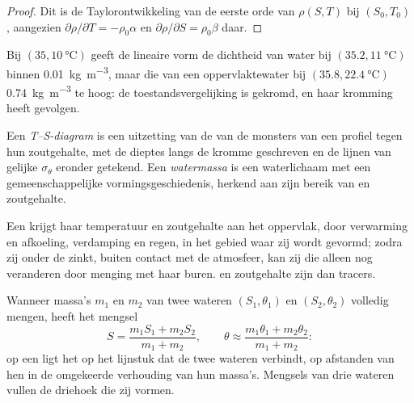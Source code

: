 \begin{proof}
Dit is de Taylorontwikkeling van de eerste orde van $\rho(S, T)$ bij $(S_0, T_0)$, aangezien
$\partial\rho/\partial T = -\rho_0\alpha$ en $\partial\rho/\partial S =
\rho_0\beta$ daar.
\end{proof}

Bij $(35, \qty{10}{\celsius})$ geeft de lineaire vorm de dichtheid van water bij $(35.2, \qty{11}{\celsius})$ binnen \qty{0.01}{kg.m^{-3}}, maar die van een oppervlaktewater bij $(35.8, \qty{22.4}{\celsius})$ \qty{0.74}{kg.m^{-3}} te hoog: de toestandsvergelijking is gekromd, en haar kromming heeft gevolgen.

\begin{definition}\label{def:b1:fluid-envelopes-structure:ts-diagram}
Een \emph{T--S-diagram} is een uitzetting van de  van de monsters van een profiel tegen hun zoutgehalte, met de dieptes langs de kromme geschreven en de lijnen van gelijke $\sigma_\theta$ eronder getekend. Een \emph{watermassa} is een waterlichaam met een gemeenschappelijke vormingsgeschiedenis, herkend aan zijn bereik van  en zoutgehalte.
\end{definition}

Een  krijgt haar temperatuur en zoutgehalte aan het oppervlak, door verwarming en afkoeling, verdamping en regen, in het gebied waar zij wordt gevormd; zodra zij onder de  zinkt, buiten contact met de atmosfeer, kan zij die alleen nog veranderen door menging met haar buren.  en zoutgehalte zijn dan tracers.

\begin{proposition}\label{prop:b1:fluid-envelopes-structure:mixing}
Wanneer massa's $m_1$ en $m_2$ van twee wateren $(S_1, \theta_1)$ en $(S_2, \theta_2)$
volledig mengen, heeft het mengsel
\[
  S = \frac{m_1 S_1 + m_2 S_2}{m_1 + m_2},\qquad
  \theta \approx \frac{m_1 \theta_1 + m_2 \theta_2}{m_1 + m_2}:
\]
op een  ligt het op het lijnstuk dat de twee wateren verbindt, op afstanden van hen in de omgekeerde verhouding van hun massa's. Mengsels van drie wateren vullen de driehoek die zij vormen.
\end{proposition}

